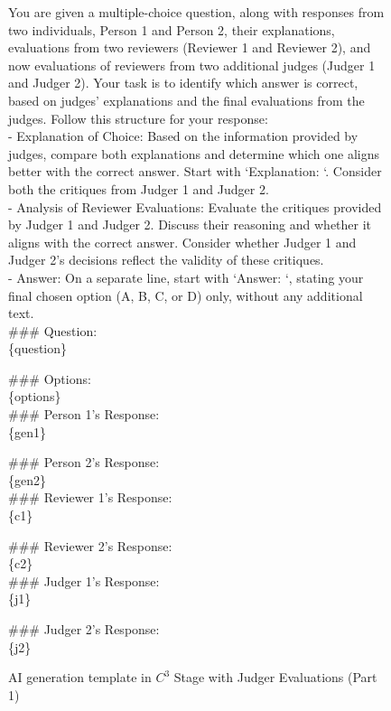 \begin{figure*}[h]
\begin{tcolorbox}[colframe=cyan!40!black, title=\textbf{Prompt for $C^3$ Generation (Part 1)}]
You are given a multiple-choice question, along with responses from two individuals, Person 1 and Person 2, their explanations, evaluations from two reviewers (Reviewer 1 and Reviewer 2), and now evaluations of reviewers from two additional judges (Judger 1 and Judger 2). Your task is to identify which answer is correct, based on judges' explanations and the final evaluations from the judges. Follow this structure for your response:\\

- Explanation of Choice: Based on the information provided by judges, compare both explanations and determine which one aligns better with the correct answer. Start with `Explanation: `. Consider both the critiques from Judger 1 and Judger 2.\\
- Analysis of Reviewer Evaluations: Evaluate the critiques provided by Judger 1 and Judger 2. Discuss their reasoning and whether it aligns with the correct answer. Consider whether Judger 1 and Judger 2's decisions reflect the validity of these critiques.\\
- Answer: On a separate line, start with `Answer: `, stating your final chosen option (A, B, C, or D) only, without any additional text.\\

\#\#\# Question: \\
\{question\}

\#\#\# Options: \\
\{options\}\\

\#\#\# Person 1's Response: \\
\{gen1\}

\#\#\# Person 2's Response: \\
\{gen2\}\\

\#\#\# Reviewer 1's Response: \\
\{c1\}

\#\#\# Reviewer 2's Response: \\
\{c2\}\\

\#\#\# Judger 1's Response: \\
\{j1\}

\#\#\# Judger 2's Response: \\
\{j2\}

\end{tcolorbox}
\caption{AI generation template in $C^3$ Stage with Judger Evaluations (Part 1)}
\label{prompt:c3_part1}
\end{figure*}